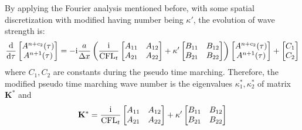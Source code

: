 By applying the Fourier analysis mentioned before,
with some spatial  discretization with modified having number
being $\kappa'$, the evolution of wave strength is:
\begin{equation}
    \derivative{ }{\tau}
    \begin{bmatrix}
        A^{n+c_2}(\tau) \\
        A^{n+1}(\tau)
    \end{bmatrix}
    =
    -\imagUnit \frac{a}{\inc x}
    \left(\frac{\imagUnit}{\CFLt}\begin{bmatrix}
        A_{11} & A_{12} \\
        A_{21} & A_{22} \\
    \end{bmatrix}
    +\kappa'
    \begin{bmatrix}
        B_{11} & B_{12} \\
        B_{21} & B_{22} \\
    \end{bmatrix}
    \right)
    \begin{bmatrix}
        A^{n+c_2}(\tau) \\
        A^{n+1}(\tau)
    \end{bmatrix}
    +
    \begin{bmatrix}
        C_1 \\C_2
    \end{bmatrix}
\end{equation}
where $C_1,C_2$ are constants during the pseudo time marching.
Therefore, the modified pseudo time marching wave number is
the eigenvalues $\kappa^*_1,\kappa^*_2$ of matrix $\mathbf{K}^*$ and
\begin{equation}
    \mathbf{K}^* = \frac{\mathrm{i}}{\text{CFL}_t}\begin{bmatrix}
        A_{11} & A_{12} \\
        A_{21} & A_{22} \\
    \end{bmatrix}
    +\kappa'
    \begin{bmatrix}
        B_{11} & B_{12} \\
        B_{21} & B_{22} \\
    \end{bmatrix}
\end{equation}

